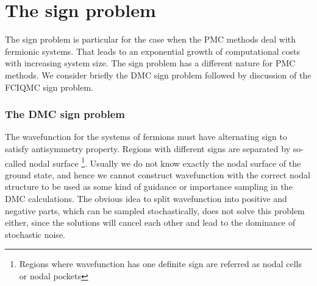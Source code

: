 \documentclass[twoside,english]{uiofysmaster}
\begin{document}
\section{The sign problem}
The sign problem is particular for the case when the PMC methods deal with fermionic systems. That leads to an exponential growth of computational costs with increasing system size. The sign problem has a different nature for PMC methods. We consider briefly the DMC sign problem followed by discussion of the FCIQMC sign problem.

\subsubsection{The DMC sign problem}

The wavefunction for the systems of fermions must have alternating sign to satisfy antisymmetry property. Regions with different signs are separated by so-called nodal surface \footnote{Regions where wavefunction has one definite sign are referred as nodal cells or nodal pockets}. Usually we do not know exactly the nodal surface of the ground state, and hence we cannot construct wavefunction with the correct nodal structure to be used as some kind of guidance or importance sampling in the DMC calculations. The obvious idea to split wavefunction into positive and negative parts, which can be sampled stochastically, does not solve this problem either, since the solutions will cancel each other and lead to the dominance of stochastic noise.
\end{document}
